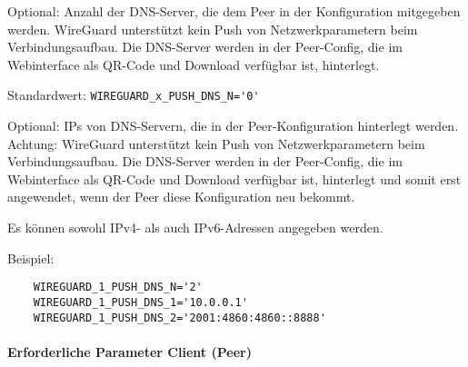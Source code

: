 \begin{description}

Optional: Anzahl der DNS-Server, die dem Peer in der Konfiguration
mitgegeben werden.  WireGuard unterstützt kein Push
von Netzwerkparametern beim Verbindungsaufbau. Die DNS-Server werden
in der Peer-Config, die im Webinterface als QR-Code und Download
verfügbar ist, hinterlegt.

Standardwert: \verb+WIREGUARD_x_PUSH_DNS_N='0'+



Optional: IPs von DNS-Servern, die in der Peer-Kon\-fi\-gu\-ra\-tion
hinterlegt werden. Achtung: WireGuard unterstützt kein Push von
Netzwerkparametern beim Verbindungsaufbau. Die DNS-Server werden in
der Peer-Config, die im Webinterface als QR-Code und Download
verfügbar ist, hinterlegt und somit erst angewendet, wenn der Peer
diese Konfiguration neu bekommt.

Es können sowohl IPv4- als auch IPv6-Adressen angegeben werden.

Beispiel:

\begin{example}
\begin{verbatim}
    WIREGUARD_1_PUSH_DNS_N='2'
    WIREGUARD_1_PUSH_DNS_1='10.0.0.1'
    WIREGUARD_1_PUSH_DNS_2='2001:4860:4860::8888'
\end{verbatim}
\end{example}

\end{description}


\paragraph{Erforderliche Parameter Client (Peer)}

